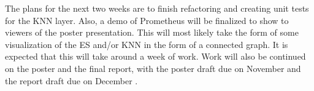 \documentclass[]{article}
\begin{document}
	The plans for the next two weeks are to finish refactoring and creating unit tests for the KNN layer. Also, a demo of Prometheus will be finalized to show to viewers of the poster presentation. This will most likely take the form of some visualization of the ES and/or KNN in the form of a connected graph. It is expected that this will take around a week of work. Work will also be continued on the poster and the final report, with the poster draft due on November  and the report draft due on December .
	
	
\end{document}
